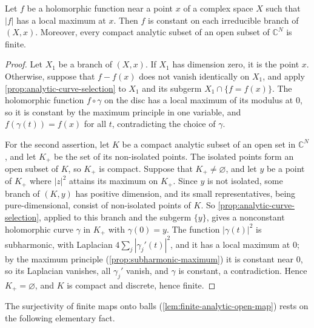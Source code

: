 \begin{corollary}\label{cor:analytic-holomorphic-maximum}
Let $f$ be a holomorphic function near a point $x$ of a complex space $X$ such that $|f|$ has a local maximum at $x$. Then $f$ is constant on each irreducible branch of $(X,x)$. Moreover, every compact analytic subset of an open subset of $\mathbb C^N$ is finite.
\end{corollary}
\begin{proof}
Let $X_1$ be a branch of $(X,x)$. If $X_1$ has dimension zero, it is the point $x$. Otherwise, suppose that $f-f(x)$ does not vanish identically on $X_1$, and apply \cref{prop:analytic-curve-selection} to $X_1$ and its subgerm $X_1\cap\{f=f(x)\}$. The holomorphic function $f\circ\gamma$ on the disc has a local maximum of its modulus at $0$, so it is constant by the maximum principle in one variable, and $f(\gamma(t))=f(x)$ for all $t$, contradicting the choice of $\gamma$.

For the second assertion, let $K$ be a compact analytic subset of an open set in $\mathbb C^N$, and let $K_+$ be the set of its non-isolated points. The isolated points form an open subset of $K$, so $K_+$ is compact. Suppose that $K_+\neq\varnothing$, and let $y$ be a point of $K_+$ where $|z|^2$ attains its maximum on $K_+$. Since $y$ is not isolated, some branch of $(K,y)$ has positive dimension, and its small representatives, being pure-dimensional, consist of non-isolated points of $K$. So \cref{prop:analytic-curve-selection}, applied to this branch and the subgerm $\{y\}$, gives a nonconstant holomorphic curve $\gamma$ in $K_+$ with $\gamma(0)=y$. The function $|\gamma(t)|^2$ is subharmonic, with Laplacian $4\sum_j|\gamma_j'(t)|^2$, and it has a local maximum at $0$; by the maximum principle (\cref{prop:subharmonic-maximum}) it is constant near $0$, so its Laplacian vanishes, all $\gamma_j'$ vanish, and $\gamma$ is constant, a contradiction. Hence $K_+=\varnothing$, and $K$ is compact and discrete, hence finite.
\end{proof}

The surjectivity of finite maps onto balls (\cref{lem:finite-analytic-open-map}) rests on the following elementary fact.

